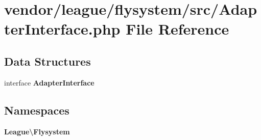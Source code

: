 \section{vendor/league/flysystem/src/\+Adapter\+Interface.php File Reference}
\label{league_2flysystem_2src_2_adapter_interface_8php}
\subsection*{Data Structures}
\begin{DoxyCompactItemize}
\item 
interface {\bf Adapter\+Interface}
\end{DoxyCompactItemize}
\subsection*{Namespaces}
\begin{DoxyCompactItemize}
\item 
 {\bf League\textbackslash{}\+Flysystem}
\end{DoxyCompactItemize}
